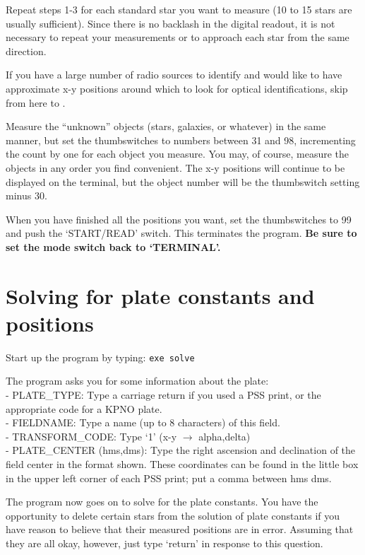 Repeat steps 1-3 for each standard star you want to measure (10 to 15 stars are
usually sufficient).  Since there is no backlash in the digital readout, it is
not necessary to repeat your measurements or to approach each star from the
same direction. 

If you have a large number of radio sources to identify and would like to have
approximate x-y positions around which to look for optical identifications,
skip from here to . 

Measure the ``unknown'' objects (stars, galaxies, or whatever) in the same
manner, but set the thumbswitches to numbers between 31 and 98, incrementing
the count by one for each object you measure. You may, of course, measure the
objects in any order you find convenient. The x-y positions will continue to be
displayed on the terminal, but the object number will be the thumbswitch
setting minus 30. 

When you have finished all the positions you want, set the thumbswitches to 99
and push the `START/READ' switch. This terminates the program. {\bf Be sure to
set the mode switch back to `TERMINAL'.} 


\section{Solving for plate constants and positions} 
\label{.solve} 

Start up the program by typing: \verb/exe solve/ 

The program asks you for some information about the plate: 
\\ - PLATE\_TYPE: Type a carriage return if you used a PSS print, or the
appropriate code for a KPNO plate. 
\\ - FIELDNAME: Type a name (up to 8 characters) of this field. 
\\ - TRANSFORM\_CODE: Type `1' (x-y $\rightarrow$ alpha,delta) 
\\ - PLATE\_CENTER (hms,dms): Type the right ascension and declination of the
field center in the format shown. These coordinates can be found in the little
box in the upper left corner of each PSS print; put a comma between hms \/ dms. 

The program now goes on to solve for the plate constants. You have the
opportunity to delete certain stars from the solution of plate constants if you
have reason to believe that their measured positions are in error.  Assuming
that they are all okay, however, just type `return' in response to this
question. 

